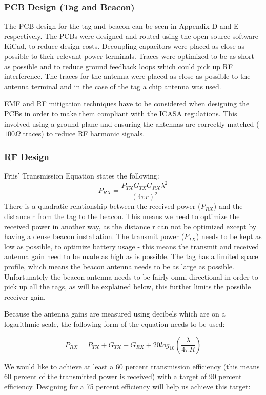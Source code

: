 \subsubsection{PCB Design (Tag and Beacon)}
The PCB design for the tag and beacon can be seen in Appendix D and E respectively. The PCBs were designed and routed using the open source software KiCad, to reduce design costs. Decoupling capacitors were placed as close as possible to their relevant power terminals. Traces were optimized to be as short as possible and to reduce ground feedback loops which could pick up RF interference. The traces for the antenna were placed as close as possible to the antenna terminal and in the case of the tag a chip antenna was used. 

EMF and RF mitigation techniques have to be considered when designing the PCBs in order to make them compliant with the ICASA regulations. This involved using a ground plane and ensuring the antennas are correctly matched ($100\Omega$ traces) to reduce RF harmonic signals.

\subsubsection{RF Design}

Friis' Transmission Equation states the following:
$$P_{RX} = \frac{P_{TX}G_{TX}G_{RX} \lambda^2}{(4 \pi r)^2}$$
There is a quadratic relationship between the received power ($P_{RX}$) and the distance r from the tag to the beacon. This means we need to optimize the received power in another way, as the distance r can not be optimized except by having a dense beacon installation. The transmit power ($P_{TX}$) needs to be kept as low as possible, to optimize battery usage - this means the transmit and received antenna gain need to be made as high as is possible. The tag has a limited space profile, which means the beacon antenna needs to be as large as possible. Unfortunately the beacon antenna needs to be fairly omni-directional in order to pick up all the tags, as will be explained below, this further limits the possible receiver gain.

Because the antenna gains are measured using decibels which are on a logarithmic scale, the following form of the equation needs to be used:

$$P_{RX} = P_{TX} + G_{TX} + G_{RX} + 20log_{10}(\frac{\lambda}{4 \pi R})$$


We would like to achieve at least a 60 percent transmission efficiency (this means 60 percent of the transmitted power is received) with a target of 90 percent efficiency. Designing for a 75 percent efficiency will help us achieve this target: 

